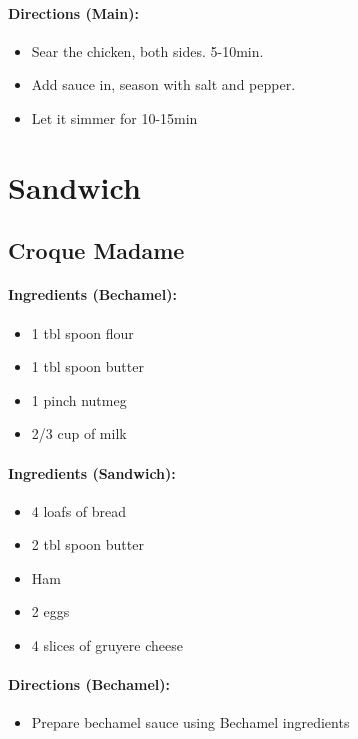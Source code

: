 \documentclass{article}
\begin{document}
\paragraph{Directions (Main):}
\begin{itemize}
    \item Sear the chicken, both sides. 5-10min.
    \item Add sauce in, season with salt and pepper.
    \item Let it simmer for 10-15min
\end{itemize} 

\section{Sandwich}


\subsection{Croque Madame} 

\paragraph{Ingredients (Bechamel):}
\begin{itemize}
    \item 1 tbl spoon flour
    \item 1 tbl spoon butter
    \item 1 pinch nutmeg
    \item 2/3 cup of milk
\end{itemize}  

\paragraph{Ingredients (Sandwich):}
\begin{itemize}
    \item 4 loafs of bread
    \item 2 tbl spoon butter
    \item Ham
    \item 2 eggs
    \item 4 slices of gruyere cheese
\end{itemize}  

\paragraph{Directions (Bechamel):}
\begin{itemize}
    \item Prepare bechamel sauce using Bechamel ingredients
\end{itemize}  
\end{document}
